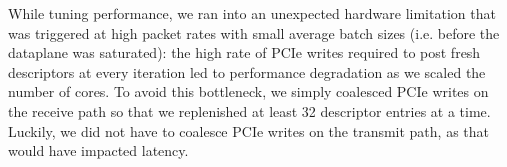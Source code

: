 \begin{comment}
\myparagraph{Subtleties of adaptive batching:} 
Batching is commonly understood to trade off higher latency at low loads
for better throughput at high loads.  Our use of adaptive, bounded
batching actually improves on both metrics. In exploring the impact of
the batch size bound --- which impacts behavior when the workload is
CPU-bound --- we first confirmed the intuition that larger batch
sizes improve throughput, but only to a point. Fig.~\ref{fig:batch}
compares the throughput of the CPU-bound benchmark used in
Fig.~\ref{fig:short10:roundtrips}.  The experiment shows that batches
as low as $B=32$ can deliver maximal throughput for this
workload. (All experiments in \S\ref{sec:eval} were conducted with a
maximal batch size of $B=64$ packets per iteration.)  Because the
algorithm is adaptive, $B$ does not impact latency when the dataplane
is not saturated; we confirmed
this experimentally at the 99th percentile latency for
\texttt{memcache}.
\end{comment}


%


While tuning \ix performance, we ran into an unexpected hardware limitation
that was triggered at high packet rates with small average batch sizes 
(i.e. before the dataplane was saturated): 
the high rate of PCIe writes required to post fresh
descriptors at every iteration led to performance degradation as we
scaled the number of cores.  To avoid this bottleneck, we
simply coalesced PCIe writes on the receive path so that we
replenished at least 32 descriptor entries at a time.  Luckily, we did
not have to coalesce PCIe writes on the transmit path, as that would
have impacted latency.


\begin{comment}
  \myparagraph{Using interrupts as a fallback:} Some applications
  service requests that require extended intervals of compute time. We
  intend for these requests to be delegated to from elastic threads to
  background threads in order to ensure that elastic threads remain
  responsive.  However, \ix can also be modified to better tolerate
  unanticipated delays during application processing in elastic
  threads.  One option would be to use interrupts as a fallback
  mode. On the receive side, the NIC would fire an interrupt whenever
  the receive descriptor ring is almost full. The dataplane could then
  move packets from the receive ring to a software structure, averting
  buffer underrun. On the transmit side, NIC would fire an interrupt
  whenever the transmit ring becomes empty so that it can be
  refilled. Such an interrupt would only need to be armed when there
  is additional transmit data pending. A desirable property of this
  approach is that neither interrupt would be triggered as long as
  elastic threads are sufficiently responsive, but if an elastic
  thread misbehaves, the \ix dataplane would be able to regain control
  and catch up on network processing.
\end{comment}


